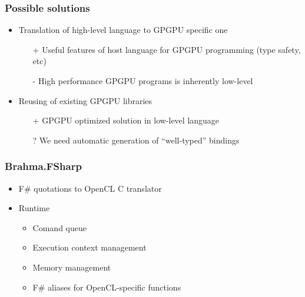 \documentclass[xcolor=table]{beamer}
\begin{document}
\begin{frame}[fragile]
  \transwipe[direction=90]
  \frametitle{Possible solutions}
  \begin{itemize}
  \item Translation of high-level language to GPGPU specific one
    \begin{itemize}
  \item[+] Useful features of host language for GPGPU programming (type safety, etc)
  \item[-] High performance GPGPU programs is inherently low-level
  \end{itemize}
  \item Reusing of existing GPGPU libraries
      \begin{itemize}
  \item[+] GPGPU optimized solution in low-level language
  \item[?] We need automatic generation of ``well-typed'' bindings
  \end{itemize}

  \end{itemize}
\end{frame}

\begin{frame}[fragile]
  \transwipe[direction=90]
  \frametitle{Brahma.FSharp}
  \begin{itemize}
  \item F\# quotations to OpenCL C translator
  \item Runtime
      \begin{itemize}
        \item Comand queue
        \item Execution context management
        \item Memory management
        \item F\# aliases for OpenCL-specific functions
      \end{itemize}

  \end{itemize}
\end{frame}
\end{document}
